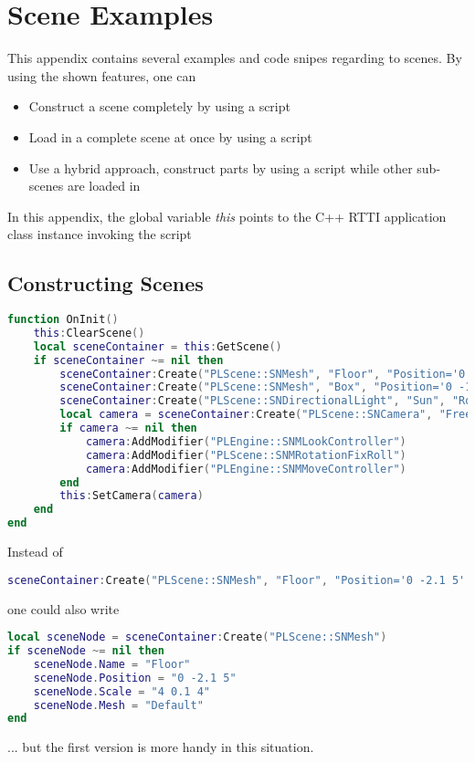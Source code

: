 \chapter{Scene Examples}
This appendix contains several examples and code snipes regarding to scenes. By using the shown features, one can
\begin{itemize}
\item{Construct a scene completely by using a script}
\item{Load in a complete scene at once by using a script}
\item{Use a hybrid approach, construct parts by using a script while other sub-scenes are loaded in}
\end{itemize}
In this appendix, the global variable \emph{this} points to the C++ \ac{RTTI} application class instance invoking the script 




\section{Constructing Scenes}
\begin{lstlisting}[language=lua]
function OnInit()
	this:ClearScene()
	local sceneContainer = this:GetScene()
	if sceneContainer ~= nil then
		sceneContainer:Create("PLScene::SNMesh", "Floor", "Position='0 -2.1 5' Scale='4 0.1 4' Rotation='0 180 0' Mesh='Default'")
		sceneContainer:Create("PLScene::SNMesh", "Box", "Position='0 -1.5 5' Scale='0.5 0.5 0.5' Mesh='Default'")
		sceneContainer:Create("PLScene::SNDirectionalLight", "Sun", "Rotation='45 0 0'")
		local camera = sceneContainer:Create("PLScene::SNCamera", "FreeCamera")
		if camera ~= nil then
			camera:AddModifier("PLEngine::SNMLookController")
			camera:AddModifier("PLScene::SNMRotationFixRoll")
			camera:AddModifier("PLEngine::SNMMoveController")
		end
		this:SetCamera(camera)
	end
end
\end{lstlisting}

Instead of
\begin{lstlisting}[language=lua]
sceneContainer:Create("PLScene::SNMesh", "Floor", "Position='0 -2.1 5' Scale='4 0.1 4' Rotation='0 180 0' Mesh='Default'")
\end{lstlisting}
one could also write
\begin{lstlisting}[language=lua]
local sceneNode = sceneContainer:Create("PLScene::SNMesh")
if sceneNode ~= nil then
	sceneNode.Name = "Floor"
	sceneNode.Position = "0 -2.1 5"
	sceneNode.Scale = "4 0.1 4"
	sceneNode.Mesh = "Default"
end
\end{lstlisting}
... but the first version is more handy in this situation.


